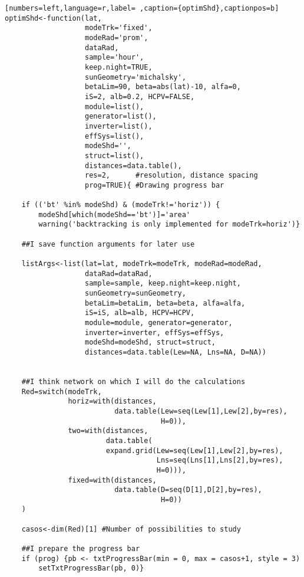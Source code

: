 \begin{lstlisting}[numbers=left,language=r,label= ,caption={optimShd},captionpos=b]
optimShd<-function(lat,
                   modeTrk='fixed', 
                   modeRad='prom', 
                   dataRad,
                   sample='hour',
                   keep.night=TRUE,
                   sunGeometry='michalsky',
                   betaLim=90, beta=abs(lat)-10, alfa=0,
                   iS=2, alb=0.2, HCPV=FALSE,
                   module=list(), 
                   generator=list(),
                   inverter=list(), 
                   effSys=list(), 
                   modeShd='',    
                   struct=list(), 
                   distances=data.table(),
                   res=2,      #resolution, distance spacing
                   prog=TRUE){ #Drawing progress bar

    if (('bt' %in% modeShd) & (modeTrk!='horiz')) {
        modeShd[which(modeShd=='bt')]='area'
        warning('backtracking is only implemented for modeTrk=horiz')}

    ##I save function arguments for later use

    listArgs<-list(lat=lat, modeTrk=modeTrk, modeRad=modeRad,
                   dataRad=dataRad,
                   sample=sample, keep.night=keep.night,
                   sunGeometry=sunGeometry,
                   betaLim=betaLim, beta=beta, alfa=alfa,
                   iS=iS, alb=alb, HCPV=HCPV,
                   module=module, generator=generator,
                   inverter=inverter, effSys=effSys,
                   modeShd=modeShd, struct=struct,
                   distances=data.table(Lew=NA, Lns=NA, D=NA))


    ##I think network on which I will do the calculations
    Red=switch(modeTrk,
               horiz=with(distances,
                          data.table(Lew=seq(Lew[1],Lew[2],by=res),
                                     H=0)),
               two=with(distances,
                        data.table(
                        expand.grid(Lew=seq(Lew[1],Lew[2],by=res),
                                    Lns=seq(Lns[1],Lns[2],by=res),
                                    H=0))),
               fixed=with(distances,
                          data.table(D=seq(D[1],D[2],by=res),
                                     H=0))
    )

    casos<-dim(Red)[1] #Number of possibilities to study

    ##I prepare the progress bar
    if (prog) {pb <- txtProgressBar(min = 0, max = casos+1, style = 3)
        setTxtProgressBar(pb, 0)}


\end{lstlisting}

